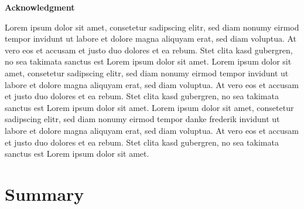 \documentclass[
  ,doc,11pt, twoside,floatsintext]{apa6}
\begin{document}
\clearpage

\mbox{}\thispagestyle{empty}\clearpage

\textbf{Acknowledgment}

\bigskip

Lorem ipsum dolor sit amet, consetetur sadipscing elitr, sed diam nonumy eirmod tempor invidunt ut labore et dolore magna aliquyam erat, sed diam voluptua. At vero eos et accusam et justo duo dolores et ea rebum. Stet clita kasd gubergren, no sea takimata sanctus est Lorem ipsum dolor sit amet. Lorem ipsum dolor sit amet, consetetur sadipscing elitr, sed diam nonumy eirmod tempor invidunt ut labore et dolore magna aliquyam erat, sed diam voluptua. At vero eos et accusam et justo duo dolores et ea rebum. Stet clita kasd gubergren, no sea takimata sanctus est Lorem ipsum dolor sit amet. Lorem ipsum dolor sit amet, consetetur sadipscing elitr, sed diam nonumy eirmod tempor danke frederik invidunt ut labore et dolore magna aliquyam erat, sed diam voluptua. At vero eos et accusam et justo duo dolores et ea rebum. Stet clita kasd gubergren, no sea takimata sanctus est Lorem ipsum dolor sit amet.

\clearpage

\mbox{}\thispagestyle{empty}\clearpage

\begin{flushleft}
{
\tableofcontents
}
\end{flushleft}

\newpage

\clearpage

\mbox{}\thispagestyle{empty}\clearpage

\thispagestyle{empty}

\hypertarget{summary}{%
\section{Summary}\label{summary}}
\end{document}
